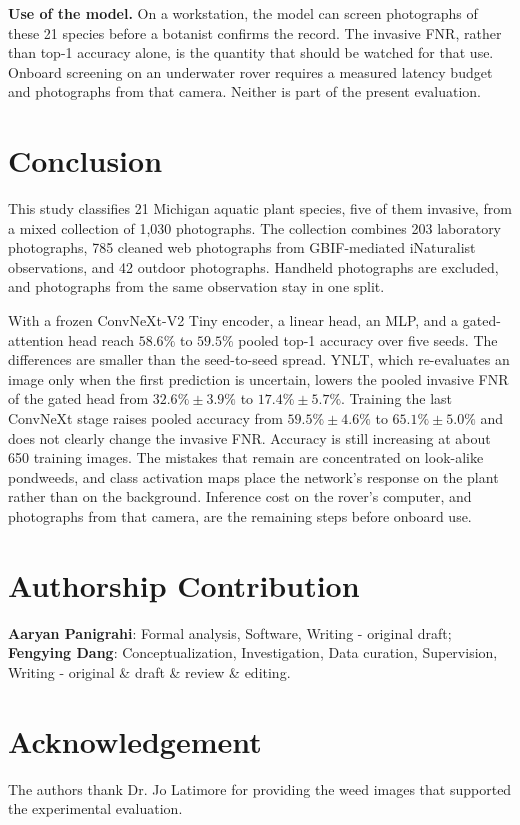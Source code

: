 \documentclass[final,3p,times,twocolumn]{elsarticle}
\begin{document}
\textbf{Use of the model.}
On a workstation, the model can screen photographs of these 21 species before a botanist confirms the record. The invasive FNR, rather than top-1 accuracy alone, is the quantity that should be watched for that use. Onboard screening on an underwater rover requires a measured latency budget and photographs from that camera. Neither is part of the present evaluation.

\section{Conclusion}
\label{sec:conclu}

This study classifies 21 Michigan aquatic plant species, five of them invasive, from a mixed collection of 1{,}030 photographs. The collection combines 203 laboratory photographs, 785 cleaned web photographs from GBIF-mediated iNaturalist observations, and 42 outdoor photographs. Handheld photographs are excluded, and photographs from the same observation stay in one split.

With a frozen ConvNeXt-V2 Tiny encoder, a linear head, an MLP, and a gated-attention head reach \(58.6\%\) to \(59.5\%\) pooled top-1 accuracy over five seeds. The differences are smaller than the seed-to-seed spread. YNLT, which re-evaluates an image only when the first prediction is uncertain, lowers the pooled invasive FNR of the gated head from \(32.6\% \pm 3.9\%\) to \(17.4\% \pm 5.7\%\). Training the last ConvNeXt stage raises pooled accuracy from \(59.5\% \pm 4.6\%\) to \(65.1\% \pm 5.0\%\) and does not clearly change the invasive FNR. Accuracy is still increasing at about 650 training images. The mistakes that remain are concentrated on look-alike pondweeds, and class activation maps place the network's response on the plant rather than on the background. Inference cost on the rover's computer, and photographs from that camera, are the remaining steps before onboard use.


\section*{Authorship Contribution}

\textbf{Aaryan Panigrahi}: Formal analysis, Software, Writing - original draft; \\
\textbf{Fengying Dang}: Conceptualization, Investigation, Data curation, Supervision, Writing - original \& draft \& review \& editing.  

\section*{Acknowledgement}
The authors thank Dr. Jo Latimore for providing the weed images that supported the experimental evaluation.


\typeout{}
% 

\end{document}
